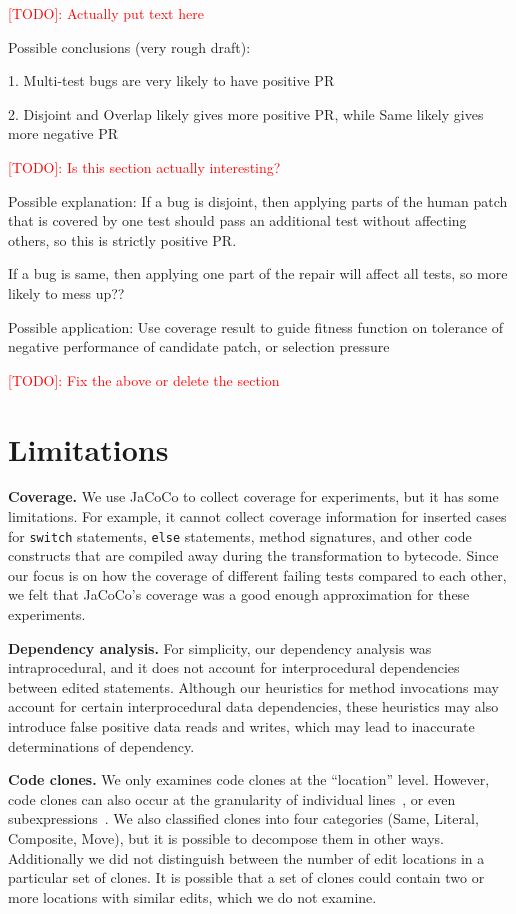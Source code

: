 \documentclass[sigconf, timestamp-false, anonymous=true]{acmart}
\newcommand\todo[1]{\textcolor{red}{#1}}
\begin{document}
\todo{[TODO]: Actually put text here}

Possible conclusions (very rough draft): 

1. Multi-test bugs are very likely to have positive PR

2. Disjoint and Overlap likely gives more positive PR, while Same likely gives more negative PR

\todo{[TODO]: Is this section actually interesting?}

Possible explanation: If a bug is disjoint, then applying parts of the human patch that is covered by one test should pass an additional test without affecting others, so this is strictly positive PR. 

If a bug is same, then applying one part of the repair will affect all tests, so more likely to mess up??

Possible application: Use coverage result to guide fitness function on tolerance of negative performance of candidate patch, or selection pressure

\todo{[TODO]: Fix the above or delete the section}

\section{Limitations}
\label{sec:limits}

\noindent\textbf{Coverage.}
We use JaCoCo to collect coverage for experiments, but it has some
limitations. For example, it cannot collect coverage information for inserted
cases for \texttt{switch} statements, \texttt{else} statements, method
signatures, and other code constructs that are compiled away during the
transformation to bytecode. Since our focus is on how the coverage of different
failing tests compared to each other, we felt that JaCoCo's coverage was a good
enough approximation for these experiments.

\vspace{1ex}
\noindent\textbf{Dependency analysis.}
For simplicity, our dependency analysis was intraprocedural, and it
does not account for interprocedural dependencies between edited statements.  Although our
heuristics for method invocations may account for certain interprocedural data
dependencies, these heuristics may also introduce false positive data reads and
writes, which may lead to inaccurate determinations of dependency.

\vspace{1ex}
\noindent\textbf{Code clones.}
We only examines code clones at the ``location'' level.  However, code clones can also occur at the
granularity of individual lines~\cite{JiaClones}, or even
subexpressions~\cite{microclones}. We also classified clones into four
categories (Same, Literal, Composite, Move), but it is possible to decompose
them in other ways.
%
Additionally we did not distinguish between the number
of edit locations in a particular set of clones. It is possible that a set of
clones could contain two or more locations with similar edits, which we do not examine. 
\end{document}
